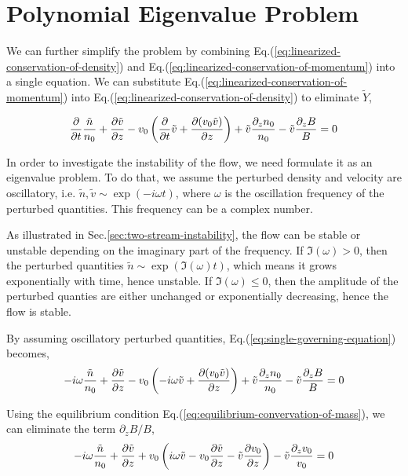 \section{Polynomial Eigenvalue Problem}
We can further simplify the problem by combining Eq.(\ref{eq:linearized-conservation-of-density}) and Eq.(\ref{eq:linearized-conservation-of-momentum}) into a single equation. We can substitute Eq.(\ref{eq:linearized-conservation-of-momentum}) into Eq.(\ref{eq:linearized-conservation-of-density}) to eliminate $\tilde{Y}$,

\begin{equation} \label{eq:single-governing-equation}
	\pdv{t}\frac{\tilde{n}}{n_0} 
	+ \pdv{\tilde{v}}{z} - v_0\left(\pdv{t}\tilde{v} 
	+ \pdv{(v_0\tilde{v})}{z}\right) 
	+ \tilde{v}\frac{\partial_z n_0}{n_0} 
	- \tilde{v}\frac{\partial_z B}{B} 
	= 0
\end{equation}

In order to investigate the instability of the flow, we need formulate it as an eigenvalue problem. To do that, we assume the perturbed density and velocity are oscillatory, i.e. $\tilde{n}, \tilde{v} \sim \exp(-i\omega t)$, where $\omega$ is the oscillation frequency of the perturbed quantities. This frequency can be a complex number. 

As illustrated in Sec.\ref{sec:two-stream-instability}, the flow can be stable or unstable depending on the imaginary part of the frequency. If $\Im(\omega) > 0$, then the perturbed quantities $\tilde{n} \sim \exp(\Im(\omega) t)$, which means it grows exponentially with time, hence unstable. If $\Im(\omega) \leq 0$, then the amplitude of the perturbed quanties are either unchanged or exponentially decreasing, hence the flow is stable.

By assuming oscillatory perturbed quantities, Eq.(\ref{eq:single-governing-equation}) becomes,
\begin{equation}
	-i\omega\frac{\tilde{n}}{n_0} 
	+ \pdv{\tilde{v}}{z} - v_0\left(-i\omega\tilde{v} 
	+ \pdv{(v_0\tilde{v})}{z}\right) 
	+ \tilde{v}\frac{\partial_z n_0}{n_0} 
	- \tilde{v}\frac{\partial_z B}{B} 
	= 0
\end{equation}

Using the equilibrium condition Eq.(\ref{eq:equilibrium-convervation-of-mass}), we can eliminate the term $\partial_z B/B$,
\[ 
	-i\omega\frac{\tilde{n}}{n_0} 
	+ \pdv{\tilde{v}}{z} 
	+ v_0\left(i\omega \tilde{v} - v_0\pdv{\tilde{v}}{z} - \tilde{v}\pdv{v_0}{z} \right)
	- \tilde{v}\frac{\partial_z v_0}{v_0} 
	= 0 
\]

